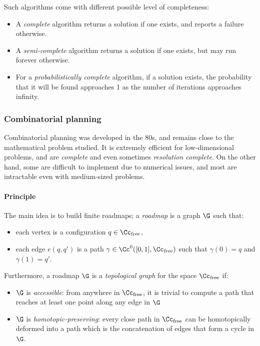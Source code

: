 Such algorithms come with different possible level of completeness:
\begin{itemize}
    \item A \emph{complete} algorithm returns a solution if one exists, and reports a failure otherwise.
    \item A \emph{semi-complete} algorithm returns a solution if one exists, but may run forever otherwise.
    \item For a \emph{probabilistically complete} algorithm, if a solution exists, the probability that it will be found approaches 1 as the number of iterations approaches infinity.
\end{itemize}

\subsubsection{Combinatorial planning}
Combinatorial planning was developed in the 80s, and remains close to the mathematical problem studied. It is extremely efficient for low-dimensional problems, and are \emph{complete} and even sometimes \emph{resolution complete}. On the other hand, some are difficult to implement due to numerical issues, and most are intractable even with medium-sized problems.

\paragraph*{Principle}
The main idea is to build finite roadmaps; a \emph{roadmap} is a graph $\G$ such that:
\begin{itemize}
    \item each vertex is a configuration $q\in\Cc_{\text{free}}$,
    \item each edge $e(q, q')$ is a path $\gamma\in\Cc^0([0,1], \Cc_{\text{free}})$ such that $\gamma(0)=q$ and $\gamma(1)=q'$.
\end{itemize}
Furthermore, a roadmap $\G$ is a \emph{topological graph} for the space $\Cc_{\text{free}}$ if:
\begin{itemize}
    \item $\G$ is \emph{accessible}: from anywhere in $\Cc_{\text{free}}$, it is trivial to compute a path that reaches at least one point along any edge in $\G$
    \item $\G$ is \emph{homotopic-preserving}: every close path in $\Cc_{\text{free}}$ can be homotopically deformed into a path which is the concatenation of edges that form a cycle in $\G$.
\end{itemize}

